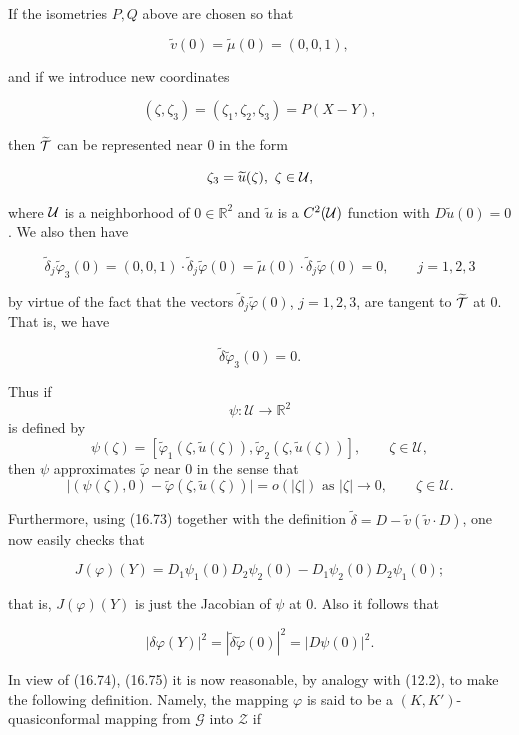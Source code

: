 If the isometries $P, Q$ above are chosen so that

\[
\widetilde{v}(0)=\widetilde{\mu}(0)=(0,0,1),
\]

and if we introduce new coordinates

\[
(\zeta,\zeta_3)=(\zeta_1,\zeta_2,\zeta_3)=P(X-Y),
\]

then $\widetilde{\mathcal{T}}$ can be represented near $0$ in the form

\[
\zeta_3=\widetilde{u}(\zeta),\ \zeta\in\Uc,
\]

where $\mathcal{U}$ is a neighborhood of $0\in\mathbb{R}^2$ and $\widetilde{u}$ is a $C^2(\mathcal{U})$ function with
$D\widetilde{u}(0)=0$.
We also then have

\[
\widetilde{\delta}_j\widetilde{\varphi}_3(0)=(0,0,1)\cdot\widetilde{\delta}_j\widetilde{\varphi}(0)
=\widetilde{\mu}(0)\cdot\widetilde{\delta}_j\widetilde{\varphi}(0)=0,\qquad j=1,2,3
\]

by virtue of the fact that the vectors $\widetilde{\delta}_j\widetilde{\varphi}(0)$, $j=1,2,3$, are tangent to $\widetilde{\mathcal{T}}$ at $0$. That is,
we have

\[
\widetilde{\delta}\widetilde{\varphi}_3(0)=0.
\]



Thus if
\[
\psi : \mathcal U \to \mathbb R^2
\]
is defined by
\[
\psi(\zeta) = [\tilde{\varphi}_1(\zeta,\tilde{u}(\zeta)), \tilde{\varphi}_2(\zeta,\tilde{u}(\zeta))], \qquad \zeta \in \mathcal U,
\]
then $\psi$ approximates $\tilde{\varphi}$ near $0$ in the sense that
\[
\bigl|(\psi(\zeta),0) - \tilde{\varphi}(\zeta,\tilde{u}(\zeta))\bigr| = o(|\zeta|) \text{ as } |\zeta| \to 0, \qquad \zeta \in \mathcal U.
\]

Furthermore, using (16.73) together with the definition $\tilde{\delta} = D - \tilde{v}(\tilde{v} \cdot D)$, one now easily checks that

\begin{equation}
J(\varphi)(Y) = D_1\psi_1(0)D_2\psi_2(0) - D_1\psi_2(0)D_2\psi_1(0);
\tag{16.74}
\end{equation}

that is, $J(\varphi)(Y)$ is just the Jacobian of $\psi$ at $0$. Also it follows that

\begin{equation}
|\delta\varphi(Y)|^2 = |\tilde{\delta}\tilde{\varphi}(0)|^2 = |D\psi(0)|^2.
\tag{16.75}
\end{equation}

In view of (16.74), (16.75) it is now reasonable, by analogy with (12.2), to make the following definition. Namely, the mapping $\varphi$ is said to be a $(K, K')$-quasiconformal mapping from $\mathcal G$ into $\mathcal Z$ if

